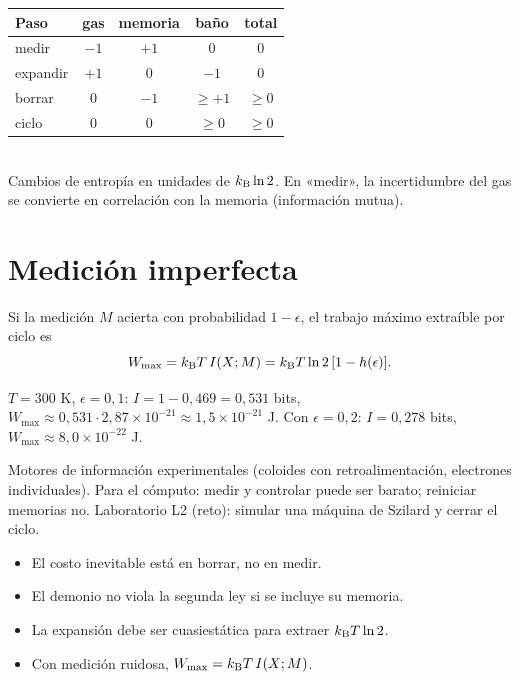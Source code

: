 \documentclass[11pt,a4paper]{article}
\begin{document}
\begin{center}
\begin{tabular}{lcccc}\toprule
Paso & gas & memoria & baño & total\\\midrule
medir & $-1$ & $+1$ & $0$ & $0$\\
expandir & $+1$ & $0$ & $-1$ & $0$\\
borrar & $0$ & $-1$ & $\ge+1$ & $\ge0$\\\midrule
ciclo & $0$ & $0$ & $\ge0$ & $\ge0$\\\bottomrule
\end{tabular}
\\[0.3em]{\small Cambios de entropía en unidades de $k_{\mathrm B}\ln2$. En «medir», la incertidumbre del gas se convierte en
correlación con la memoria (información mutua).}
\end{center}

\section{Medición imperfecta}
Si la medición $M$ acierta con probabilidad $1-\epsilon$, el trabajo máximo extraíble por ciclo es
\begin{equation}W_{\max}=k_{\mathrm B} T\,I(X;M)=k_{\mathrm B} T\ln2\,[1-h(\epsilon)].\end{equation}
\begin{ejemplo}
$T=300$ K, $\epsilon=0{,}1$: $I=1-0{,}469=0{,}531$ bits, $W_{\max}\approx0{,}531\cdot2{,}87\times10^{-21}\approx1{,}5\times10^{-21}$ J.
Con $\epsilon=0{,}2$: $I=0{,}278$ bits, $W_{\max}\approx8{,}0\times10^{-22}$ J.
\end{ejemplo}

\begin{aplicacion}
Motores de información experimentales (coloides con retroalimentación, electrones individuales). Para el cómputo:
medir y controlar puede ser barato; reiniciar memorias no. Laboratorio L2 (reto): simular una máquina de Szilard y cerrar el ciclo.
\end{aplicacion}

\begin{error}
\begin{itemize}[nosep]
\item El costo inevitable está en borrar, no en medir.
\item El demonio no viola la segunda ley si se incluye su memoria.
\item La expansión debe ser cuasiestática para extraer $k_{\mathrm B} T\ln2$.
\item Con medición ruidosa, $W_{\max}=k_{\mathrm B} T\,I(X;M)$.
\end{itemize}
\end{error}
\end{document}
